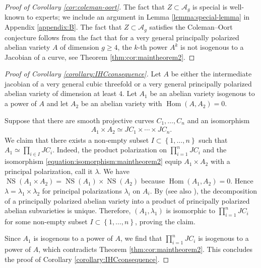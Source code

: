 \documentclass[a4paper,11pt,reqno]{amsart}
\numberwithin{equation}{section}
\theoremstyle{plain}
\theoremstyle{definition}
\newcommand{\Hom}{\operatorname{Hom}}
\newcommand{\NS}{\operatorname{NS}}
\renewcommand{\cong}{\simeq}
\newcommand{\set}[1]{\left\{ #1 \right\}}
\begin{document}
\begin{proof}[Proof of Corollary \ref{cor:coleman-oort}] 
The fact that $Z\subset \mathcal A_g$ is special is  well-known to experts; we include an argument in Lemma \ref{lemma:special-lemma} in Appendix \ref{appendix:B}. 
The fact that $Z\subset \mathcal A_g$ satisfies the Coleman--Oort conjecture follows from the fact that for a very general principally polarized abelian variety $A$ of dimension $g \geq 4$, the $k$-th power $A^k$ is not isogenous to a Jacobian of a curve, see Theorem \ref{thm:cor:maintheorem2}. 
 \end{proof}
  
\begin{proof}[Proof of Corollary \ref{corollary:IHCconsequence}]
Let $A$ be either the intermediate jacobian of a very general cubic threefold or a very general principally polarized abelian variety of dimension at least $4$.
Let $A_1$ be an abelian variety isogenous to a power of $A$ and let $A_2$ be an abelian variety with $\Hom(A,A_2)=0$.

Suppose that there are smooth projective curves $C_1,\dots ,C_n$ and an isomorphism
 \begin{align} \label{equation:isomorphism:maintheorem2}
 A_1 \times A_2 \cong JC_1 \times \cdots \times JC_n .
 \end{align}
 We claim that there exists a non-empty subset $I \subset \set{1,\dotsc, n}$ such that $A_1 \cong \prod_{i \in I}JC_i$. Indeed, the product polarization on $\prod_{i =1}^nJC_i$ and the isomorphism \eqref{equation:isomorphism:maintheorem2} equip $A_1 \times A_2$ with a principal polarization, call it $\lambda$. We have $\NS(A_1 \times A_2) = \NS(A_1) \times \NS(A_2)$ because $\Hom(A_1, A_2) = 0$. Hence $\lambda = \lambda_1 \times \lambda_2$ for principal polarizations $\lambda_i$ on $A_i$. By \cite[Corollary 3.23]{clemensgriffiths-cubicthreefold} (see also \cite{debarre-produits}), the decomposition of a principally polarized abelian variety into a product of principally polarized abelian subvarieties is unique. Therefore, $(A_1, \lambda_1)$ is isomorphic to $\prod_{i =1}^nJC_i$ for some non-empty subset $I \subset \set{1,\dotsc, n}$, proving the claim. 
 
 Since $A_1$ is isogenous to a power of $A$, we find that $\prod_{i =1}^nJC_i$ is isogenous to a power of $A$, which
 contradicts Theorem \ref{thm:cor:maintheorem2}.
 This concludes the proof of Corollary \ref{corollary:IHCconsequence}.
\end{proof}
\end{document}
